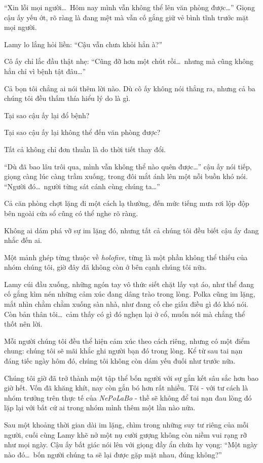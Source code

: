 \documentclass[../main.tex]{subfiles}
\begin{document}
``Xin lỗi mọi người\dots\ Hôm nay mình vẫn không thể lên văn phòng được\dots'' Giọng cậu ấy yếu ớt, rõ ràng là đang mệt mà vẫn cố gắng giữ vẻ bình tĩnh trước mặt mọi người.

Lamy lo lắng hỏi liền: ``Cậu vẫn chưa khỏi hẳn à?''

Cô ấy chỉ lắc đầu thật nhẹ: ``Cũng đỡ hơn một chút rồi\dots\ nhưng mà cũng không hẳn chỉ vì bệnh tật đâu\dots''

Cả bọn tôi chẳng ai nói thêm lời nào. Dù cô ấy không nói thẳng ra, nhưng cả ba chúng tôi đều thấm thía hiểu lý do là gì.

Tại sao cậu ấy lại đổ bệnh?

Tại sao cậu ấy lại không thể đến văn phòng được?

Tất cả không chỉ đơn thuần là do thời tiết thay đổi.

``Dù đã bao lâu trôi qua, mình vẫn không thể nào quên được\dots'' cậu ấy nói tiếp, giọng càng lúc càng trầm xuống, trong đôi mắt ánh lên một nỗi buồn khó nói. ``Người đó\dots\ người từng sát cánh cùng chúng ta\dots''

Cả căn phòng chợt lặng đi một cách lạ thường, đến mức tiếng mưa rơi lộp độp bên ngoài cửa sổ cũng có thể nghe rõ ràng.

Không ai dám phá vỡ sự im lặng đó, nhưng tất cả chúng tôi đều biết cậu ấy đang nhắc đến ai.

Một mảnh ghép từng thuộc về \textit{holofive}, từng là một phần không thể thiếu của nhóm chúng tôi, giờ đây đã không còn ở bên cạnh chúng tôi nữa.

Lamy cúi đầu xuống, những ngón tay vô thức siết chặt lấy vạt áo, như thể đang cố gắng kìm nén những cảm xúc đang dâng trào trong lòng. Polka cũng im lặng, mắt nhìn chằm chằm xuống sàn nhà, như đang cố che giấu điều gì đó khó nói. Còn bản thân tôi\dots\ cảm thấy có gì đó nghẹn lại ở cổ, muốn nói mà chẳng thể thốt nên lời.

Mỗi người chúng tôi đều thể hiện cảm xúc theo cách riêng, nhưng có một điểm chung: chúng tôi sẽ mãi khắc ghi người bạn đó trong lòng. Kể từ sau tai nạn đáng tiếc ngày hôm đó, chúng tôi không còn dám yếu đuối như trước nữa.

Chúng tôi giờ đã trở thành một tập thể bốn người với sự gắn kết sâu sắc hơn bao giờ hết. Vốn đã khăng khít, nay còn gắn bó hơn rất nhiều. Tôi - với tư cách là nhóm trưởng trên thực tế của \textit{NePoLaBo} - thề sẽ không để tai nạn đau lòng đó lặp lại với bất cứ ai trong nhóm mình thêm một lần nào nữa.

Sau một khoảng thời gian dài im lặng, chìm trong những suy tư riêng của mỗi người, cuối cùng Lamy khẽ nở một nụ cười gượng không còn niềm vui rạng rỡ như mọi ngày. Cậu ấy bất giác nói lên với giọng đầy ẩn chứa hy vọng: ``Một ngày nào đó\dots\ bốn người chúng ta sẽ lại được gặp mặt nhau, đúng không?''
\end{document}
